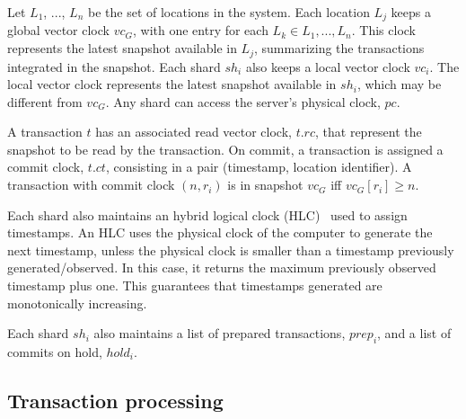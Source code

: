 \documentclass[sigplan,twocolumn,review,anonymous]{acmart}
\begin{document}

Let $L_1$, ..., $L_n$ be the set of locations in the system. 
Each location $L_j$ keeps a global vector clock $\mathit{vc}_G$, with one entry for each $L_k \in L_1, ..., L_n$.
This clock represents the latest snapshot available in $L_j$, summarizing the transactions integrated in the snapshot.
Each shard $\mathit{sh}_i$ also keeps a local vector clock $\mathit{vc}_i$.
The local vector clock represents the latest snapshot available in $sh_i$, which may be different 
from $\mathit{vc}_G$.
Any shard can access the server's physical clock, $\mathit{pc}$.

A transaction $t$ has an associated read vector clock, $t\!.\mathit{rc}$,  that represent the snapshot
to be read by the transaction. On commit, a transaction is assigned a commit clock, $t\!.\mathit{ct}$, consisting in a 
pair (timestamp, location identifier).  A transaction with commit clock $(n,r_i)$ is in snapshot $\mathit{vc}_G$ iff
$\mathit{vc}_G[r_i] \geq n$.

Each shard also maintains an hybrid logical clock (HLC)~\cite{hlc} used to assign timestamps. An HLC uses the 
physical clock of the computer to generate the next timestamp, unless the physical clock is smaller than a timestamp
previously generated/observed. In this case, it returns the maximum previously observed timestamp plus one. 
This guarantees that timestamps generated are monotonically increasing.

Each shard $\mathit{sh}_i$ also maintains a list of prepared transactions, $\mathit{prep_i}$, and a list of commits on hold, $\mathit{hold}_i$.


\subsection{Transaction processing}
\label{subsec:txnproc}
\end{document}
